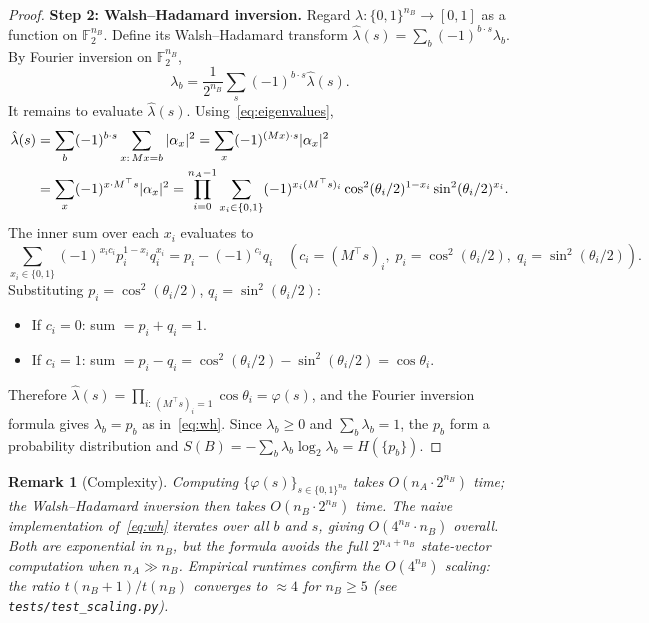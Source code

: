 \documentclass[11pt,a4paper]{article}
\newtheorem{remark}[theorem]{Remark}
\newcommand{\F}{\mathbb{F}}
\newcommand{\VNE}{S}
\begin{document}
\begin{proof}
\textbf{Step 2: Walsh–Hadamard inversion.}
Regard $\lambda : \{0,1\}^{n_B} \to [0,1]$ as a function on $\F_2^{n_B}$.
Define its Walsh–Hadamard transform
$\hat\lambda(s) = \sum_b (-1)^{b\cdot s}\lambda_b$.
By Fourier inversion on $\F_2^{n_B}$,
\begin{equation}
  \lambda_b = \frac{1}{2^{n_B}} \sum_{s} (-1)^{b\cdot s} \hat\lambda(s).
\end{equation}
It remains to evaluate $\hat\lambda(s)$.  Using~\eqref{eq:eigenvalues},
\begin{align}
  \hat\lambda(s)
  &= \sum_b (-1)^{b\cdot s} \sum_{x:\,Mx=b} |\alpha_x|^2
   = \sum_x (-1)^{(Mx)\cdot s} |\alpha_x|^2 \notag\\
  &= \sum_x (-1)^{x\cdot M^\top s} |\alpha_x|^2
   = \prod_{i=0}^{n_A-1}
     \sum_{x_i \in \{0,1\}} (-1)^{x_i (M^\top s)_i}
     \cos^2(\theta_i/2)^{1-x_i} \sin^2(\theta_i/2)^{x_i}.
   \label{eq:hat_lambda}
\end{align}
The inner sum over each $x_i$ evaluates to
\begin{equation}
  \sum_{x_i \in \{0,1\}} (-1)^{x_i c_i} p_i^{1-x_i} q_i^{x_i}
  = p_i - (-1)^{c_i} q_i
  \quad (c_i = (M^\top s)_i,\; p_i = \cos^2(\theta_i/2),\; q_i = \sin^2(\theta_i/2)).
\end{equation}
Substituting $p_i = \cos^2(\theta_i/2)$, $q_i = \sin^2(\theta_i/2)$:
\begin{itemize}
  \item If $c_i = 0$: sum $= p_i + q_i = 1$.
  \item If $c_i = 1$: sum $= p_i - q_i = \cos^2(\theta_i/2) - \sin^2(\theta_i/2) = \cos\theta_i$.
\end{itemize}
Therefore $\hat\lambda(s) = \prod_{i:\,(M^\top s)_i=1} \cos\theta_i = \varphi(s)$,
and the Fourier inversion formula gives $\lambda_b = p_b$ as
in~\eqref{eq:wh}.  Since $\lambda_b \geq 0$ and $\sum_b \lambda_b = 1$,
the $p_b$ form a probability distribution and
$\VNE(B) = -\sum_b \lambda_b \log_2 \lambda_b = H(\{p_b\})$.
\end{proof}

\begin{remark}[Complexity]
Computing $\{\varphi(s)\}_{s \in \{0,1\}^{n_B}}$ takes $O(n_A \cdot 2^{n_B})$ time;
the Walsh--Hadamard inversion then takes $O(n_B \cdot 2^{n_B})$ time.
The naive implementation of~\eqref{eq:wh} iterates over all $b$ and $s$,
giving $O(4^{n_B} \cdot n_B)$ overall.
Both are exponential in $n_B$, but the formula avoids the full $2^{n_A+n_B}$
state-vector computation when $n_A \gg n_B$.  Empirical runtimes confirm the
$O(4^{n_B})$ scaling: the ratio $t(n_B{+}1)/t(n_B)$ converges to $\approx 4$
for $n_B \geq 5$ (see \texttt{tests/test\_scaling.py}).
\end{remark}
\end{document}

